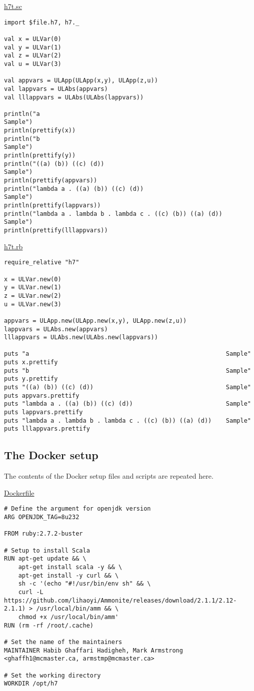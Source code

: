 \documentclass[11pt]{article}
\begin{document}
\href{./testing/h7/h7t.sc}{h7t.sc}
\begin{verbatim}
import $file.h7, h7._

val x = ULVar(0)
val y = ULVar(1)
val z = ULVar(2)
val u = ULVar(3)

val appvars = ULApp(ULApp(x,y), ULApp(z,u))
val lappvars = ULAbs(appvars)
val lllappvars = ULAbs(ULAbs(lappvars))

println("a                                                       Sample")
println(prettify(x))
println("b                                                       Sample")
println(prettify(y))
println("((a) (b)) ((c) (d))                                     Sample")
println(prettify(appvars))
println("lambda a . ((a) (b)) ((c) (d))                          Sample")
println(prettify(lappvars))
println("lambda a . lambda b . lambda c . ((c) (b)) ((a) (d))    Sample")
println(prettify(lllappvars))
\end{verbatim}

\href{./testing/h7/h7t.rb}{h7t.rb}
\begin{verbatim}
require_relative "h7"

x = ULVar.new(0)
y = ULVar.new(1)
z = ULVar.new(2)
u = ULVar.new(3)

appvars = ULApp.new(ULApp.new(x,y), ULApp.new(z,u))
lappvars = ULAbs.new(appvars)
lllappvars = ULAbs.new(ULAbs.new(lappvars))

puts "a                                                       Sample"
puts x.prettify
puts "b                                                       Sample"
puts y.prettify
puts "((a) (b)) ((c) (d))                                     Sample"
puts appvars.prettify
puts "lambda a . ((a) (b)) ((c) (d))                          Sample"
puts lappvars.prettify
puts "lambda a . lambda b . lambda c . ((c) (b)) ((a) (d))    Sample"
puts lllappvars.prettify
\end{verbatim}

\subsection*{The Docker setup}
\label{sec:orgd9f600a}
The contents of the Docker setup files and scripts are repeated here.

\href{./testing/h7/Dockerfile}{Dockerfile}
\begin{verbatim}
# Define the argument for openjdk version
ARG OPENJDK_TAG=8u232

FROM ruby:2.7.2-buster

# Setup to install Scala
RUN apt-get update && \
    apt-get install scala -y && \
    apt-get install -y curl && \
    sh -c '(echo "#!/usr/bin/env sh" && \
    curl -L https://github.com/lihaoyi/Ammonite/releases/download/2.1.1/2.12-2.1.1) > /usr/local/bin/amm && \
    chmod +x /usr/local/bin/amm'
RUN (rm -rf /root/.cache)
     
# Set the name of the maintainers
MAINTAINER Habib Ghaffari Hadigheh, Mark Armstrong <ghaffh1@mcmaster.ca, armstmp@mcmaster.ca>

# Set the working directory
WORKDIR /opt/h7
\end{verbatim}
\end{document}
